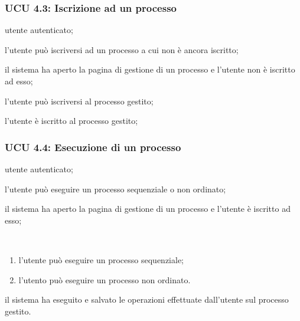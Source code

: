 \subsubsection{UCU 4.3: Iscrizione ad un processo}
\begin{description}[leftmargin=0cm]
\item[Attori:] utente autenticato;
\item[Descrizione:] l'utente può iscriversi ad un processo a cui non è ancora iscritto;
\item[Precondizione:] il sistema ha aperto la pagina di gestione di un processo e l'utente non è iscritto ad esso;
\item[Scenario principale:] l'utente può iscriversi al processo gestito;
\item[Postcondizione:] l'utente è iscritto al processo gestito;
\end{description}

\subsubsection{UCU 4.4: Esecuzione di un processo}
\begin{description}[leftmargin=0cm]
\item[Attori:] utente autenticato;
\item[Descrizione:] l'utente può eseguire un processo sequenziale o non ordinato;
\item[Precondizione:] il sistema ha aperto la pagina di gestione di un processo e l'utente è iscritto ad esso;
\item[Scenario principale:]\
\begin{enumerate}
\item l'utente può eseguire un processo sequenziale;
\item l'utento può eseguire un processo non ordinato.
\end{enumerate}
\item[Postcondizione:] il sistema ha eseguito e salvato le operazioni effettuate dall'utente sul processo gestito.
\end{description}

